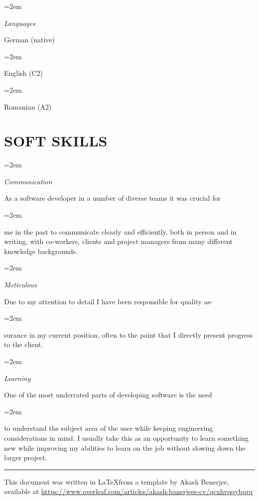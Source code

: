 \documentclass[paper=a4,fontsize=11pt]{scrartcl} %
\newlength{\spacebox}
\newcommand{\sepspace}{\vspace*{1em}}		%
\newcommand{\NewPart}[1]{\section*{\uppercase{#1}}}
\newcommand{\PersonalEntry}[2]{
		\noindent\hangindent=2em\hangafter=0 %
		\parbox{\spacebox}{        %
		\textit{#1}}		       %
		\hspace{1.5em} #2 \par}    %
\newcommand{\SkillsEntry}[2]{      %
		\noindent\hangindent=2em\hangafter=0 %
		\parbox{\spacebox}{        %
		\textit{#1}}			   %
		\hspace{1.5em} \parbox{6\spacebox}{#2} \par}    %
\begin{document}
\SkillsEntry{Languages}{German (native)}
\SkillsEntry{}{English (C2)}
\SkillsEntry{}{Romanian (A2)}
\sepspace


\NewPart{Soft Skills}{}

\SkillsEntry{Communication}{As a software developer in a number of diverse teams it was crucial for }
\vspace{3pt}
\SkillsEntry{}{me in the past to communicate clearly and efficiently, both in person and in writing, with co-workers, clients and project managers from many different knowledge backgrounds.}
\sepspace

\SkillsEntry{Meticulous}{Due to my attention to detail I have been responsible for quality as-}
\vspace{3pt}
\SkillsEntry{}{surance in my current position, often to the point that I directly present progress to the client.}
\sepspace

\SkillsEntry{Learning}{One of the most underrated parts of developing software is the need }
\vspace{3pt}
\SkillsEntry{}{to understand the subject area of the user while keeping engineering considerations in mind. I usually take this as an opportunity to learn something new while improving my abilities to learn on the job without slowing down the larger project.}
\sepspace

%
%


\vfill
\small
\centering
\rule{\linewidth}{0.4pt}
This document was written in \LaTeX\space from a template by Akash Benerjee, available at \url{https://www.overleaf.com/articles/akash-banerjees-cv/qcxhvqqybqrq}
% 
\end{document}
